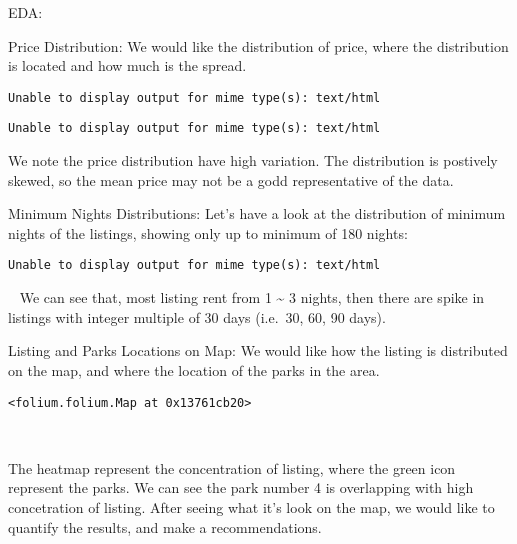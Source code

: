 \documentclass[
  ignorenonframetext,
]{beamer}
\begin{document}
\begin{frame}[fragile]{EDA:}
\protect\hypertarget{eda}{}
\begin{block}{Price Distribution:}
\protect\hypertarget{price-distribution}{}
We would like the distribution of price, where the distribution is
located and how much is the spread.

\begin{verbatim}
Unable to display output for mime type(s): text/html
\end{verbatim}

\begin{verbatim}
Unable to display output for mime type(s): text/html
\end{verbatim}

\hfill\break

We note the price distribution have high variation. The distribution is
postively skewed, so the mean price may not be a godd representative of
the data.
\end{block}
\end{frame}

\begin{frame}[fragile]{Minimum Nights Distributions:}
\protect\hypertarget{minimum-nights-distributions}{}
Let's have a look at the distribution of minimum nights of the listings,
showing only up to minimum of 180 nights:

\begin{verbatim}
Unable to display output for mime type(s): text/html
\end{verbatim}

~ We can see that, most listing rent from 1 \textasciitilde{} 3 nights,
then there are spike in listings with integer multiple of 30 days
(i.e.~30, 60, 90 days).
\end{frame}

\begin{frame}[fragile]{Listing and Parks Locations on Map:}
\protect\hypertarget{listing-and-parks-locations-on-map}{}
We would like how the listing is distributed on the map, and where the
location of the parks in the area.

\begin{verbatim}
<folium.folium.Map at 0x13761cb20>
\end{verbatim}

~

The heatmap represent the concentration of listing, where the green icon
represent the parks. We can see the park number 4 is overlapping with
high concetration of listing. After seeing what it's look on the map, we
would like to quantify the results, and make a recommendations.
\end{frame}
\end{document}
